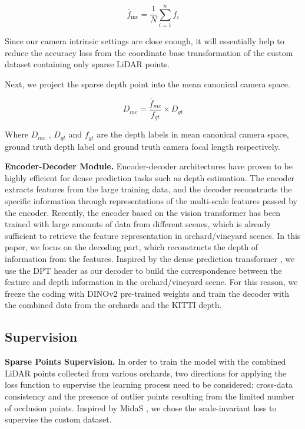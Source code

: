 \documentclass{article}
\begin{document}
\begin{equation}
    \bar{f}_{\text{mc}} = \frac{1}{N} \sum_{i=1}^{n} f_i
\end{equation}

Since our camera intrinsic settings are close enough, it will essentially help to reduce the accuracy loss from the coordinate base transformation of the custom dataset containing only sparse LiDAR points.

Next, we project the sparse depth point into the mean canonical camera space.

\begin{equation}
    {D}_{mc} = \frac{\bar{f}_{mc}}{f_{gt}} \times D_{gt}
\end{equation}

Where \(D_{mc}\) , \(D_{gt}\) and \(f_{gt}\) are the depth labels in mean canonical camera space, ground truth depth label and ground truth camera focal length respectively.

\vspace{10pt}
\noindent \textbf{Encoder-Decoder Module.} Encoder-decoder architectures have proven to be highly efficient for dense prediction tasks such as depth estimation. The encoder extracts features from the large training data, and the decoder reconstructs the specific information through representations of the multi-scale features passed by the encoder. Recently, the encoder based on the vision transformer \cite{darcet2023vitneedreg} has been trained with large amounts of data from different scenes, which is already sufficient to retrieve the feature representation in orchard/vineyard scenes. In this paper, we focus on the decoding part, which reconstructs the depth of information from the features. Inspired by the dense prediction transformer \cite{dpt}, we use the DPT header as our decoder to build the correspondence between the feature and depth information in the orchard/vineyard scene. For this reason, we freeze the coding with DINOv2 \cite{oquab2023dinov2} pre-trained weights and train the decoder with the combined data from the orchards and the KITTI depth. 

\subsection{Supervision}
\textbf{Sparse Points Supervision.} In order to train the model with the combined LiDAR points collected from various orchards, two directions for applying the loss function to supervise the learning process need to be considered: cross-data consistency and the presence of outlier points resulting from the limited number of occlusion points. Inspired by MidaS \cite{MiDaS}, we chose the scale-invariant loss to supervise the custom dataset.
\end{document}

